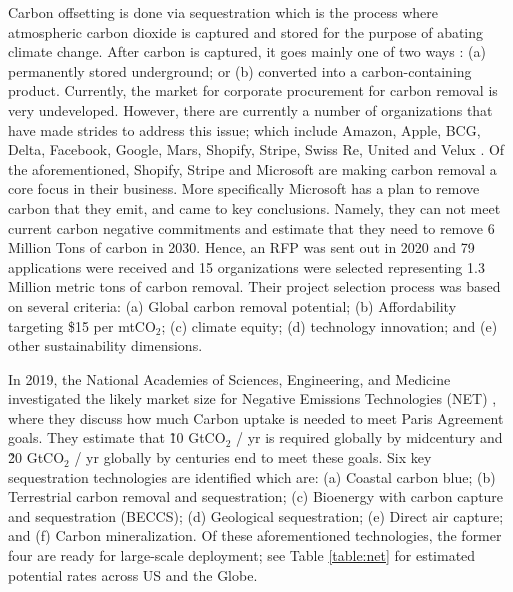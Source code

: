 \documentclass{article}
\begin{document}
Carbon offsetting is done via sequestration which is the process where atmospheric carbon dioxide is captured and stored for the purpose of abating climate change. After carbon is captured, it goes mainly one of two ways \cite{CBC19}: (a) permanently stored underground; or (b) converted into a carbon-containing product. Currently, the market for corporate procurement for carbon removal is very undeveloped. However, there are currently a number of organizations that have made strides to address this issue; which include Amazon, Apple, BCG, Delta, Facebook, Google, Mars, Shopify, Stripe, Swiss Re, United and Velux \cite{Mic21}. Of the aforementioned, Shopify, Stripe and Microsoft are making carbon removal a core focus in their business. More specifically Microsoft has a plan to remove carbon that they emit, and came to key conclusions. Namely, they can not meet current carbon negative commitments and estimate that they need to remove 6 Million Tons of carbon in 2030. Hence, an RFP was sent out in 2020 and 79 applications were received and 15 organizations were selected representing 1.3 Million metric tons of carbon removal. Their project selection process was based on several criteria: (a) Global carbon removal potential; (b) Affordability targeting \$15 per mtCO$_{2}$; (c) climate equity; (d) technology innovation; and (e) other sustainability dimensions. 

In 2019, the National Academies of Sciences, Engineering, and Medicine investigated the likely market size for Negative Emissions Technologies (NET) \cite{NET19}, where they discuss how much Carbon uptake is needed to meet Paris Agreement goals. They estimate that \~ 10 GtCO$_{2}$ / yr is required globally by midcentury and \~ 20 GtCO$_{2}$ / yr globally by centuries end to meet these goals. Six key sequestration technologies are identified which are: (a) Coastal carbon blue; (b) Terrestrial carbon removal and sequestration; (c) Bioenergy with carbon capture and sequestration (BECCS); (d) Geological sequestration; (e) Direct air capture;  and (f) Carbon mineralization. Of these aforementioned technologies, the former four are ready for large-scale deployment; see Table \ref{table:net} for estimated potential rates across US and the Globe.
\end{document}
